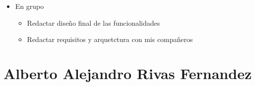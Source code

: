 \begin{itemize}
\begin{itemize}
\begin{itemize}
            \end{itemize}
        \item En grupo
            \begin{itemize}
                \item Redactar diseño final de las funcionalidades 
                \item Redactar requisitos y arquetctura con mis compañeros
            
                
                
            \end{itemize}
    \end{itemize}
\end{itemize}

\section{Alberto Alejandro Rivas Fernandez}
